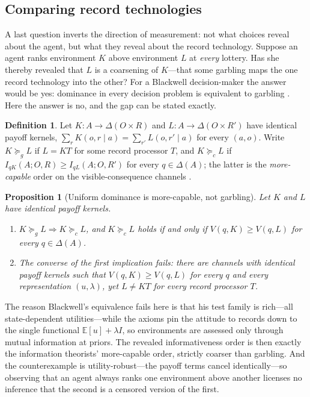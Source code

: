 \documentclass[11pt,a4paper]{article}
\newtheorem{proposition}[theorem]{Proposition}
\theoremstyle{definition}
\newtheorem{definition}[theorem]{Definition}
\newcommand{\D}{\Delta}
\newcommand{\E}{\mathbb E}
\newcommand{\I}{I}
\newcommand{\1}{\mathbf 1}
\begin{document}
\subsection{Comparing record technologies}\label{sec:cannot-reveal}

A last question inverts the direction of measurement: not what choices reveal about the agent, but what they
reveal about the record technology.  Suppose an agent ranks environment $K$ above environment $L$ at \emph{every} lottery.  Has she thereby revealed
that $L$ is a coarsening of $K$---that some garbling maps the one record technology into the other?  For a
Blackwell decision-maker the answer would be yes: dominance in every decision problem is equivalent to garbling
\cite{Blackwell1953}.  Here the answer is no, and the gap can be stated exactly.

\begin{definition}\label{def:channel-orders}
Let $K:A\to\D(O\times R)$ and $L:A\to\D(O\times R')$ have identical payoff kernels,
$\sum_rK(o,r\mid a)=\sum_{r'}L(o,r'\mid a)$ for every $(a,o)$.  Write $K\succeq_gL$ if $L=KT$ for some record
processor $T$, and $K\succeq_cL$ if
$\I_{qK}(A;O,R)\ge\I_{qL}(A;O,R')$ for every $q\in\D(A)$; the latter is the \emph{more-capable} order on the
visible-consequence channels \cite{KornerMarton1977}.
\end{definition}

\begin{proposition}[Uniform dominance is more-capable, not garbling]\label{prop:blackwell}
Let $K$ and $L$ have identical payoff kernels.
\begin{enumerate}[label=\textup{(\roman*)},leftmargin=*]
\item $K\succeq_gL\Rightarrow K\succeq_cL$, and $K\succeq_cL$ holds if and only if $V(q,K)\ge V(q,L)$ for every
$q\in\D(A)$.
\item The converse of the first implication fails: there are channels with identical payoff kernels such that
$V(q,K)\ge V(q,L)$ for every $q$ and every representation $(u,\lambda)$, yet $L\ne KT$ for every record processor
$T$.
\end{enumerate}
\end{proposition}

The reason Blackwell's equivalence fails here is that his test family is rich---all state-dependent
utilities---while the axioms pin the attitude to records down to the single functional $\E[u]+\lambda\I$, so environments are
assessed only through mutual information at priors.  The revealed informativeness order is then exactly the
information theorists' more-capable order, strictly coarser than garbling.  And the counterexample is
utility-robust---the payoff terms cancel identically---so observing that an agent always ranks one environment
above another licenses no inference that the second is a censored version of the first.
\end{document}
